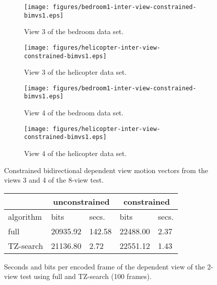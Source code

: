 \documentclass[12pt]{article}
\begin{document}
\begin{figure}
\centering
\begin{subfigure}{.5\textwidth}
\centering
\texttt{[image: figures/bedroom1-inter-view-constrained-bimvs1.eps]}
\caption{View 3 of the bedroom data set.}
\end{subfigure}
\begin{subfigure}{.5\textwidth}
\centering
\texttt{[image: figures/helicopter-inter-view-constrained-bimvs1.eps]}
\caption{View 3 of the helicopter data set.}
\end{subfigure}
\begin{subfigure}{.5\textwidth}
\centering
\texttt{[image: figures/bedroom1-inter-view-constrained-bimvs1.eps]}
\caption{View 4 of the bedroom data set.}
\end{subfigure}
\begin{subfigure}{.5\textwidth}
\centering
\texttt{[image: figures/helicopter-inter-view-constrained-bimvs1.eps]}
\caption{View 4 of the helicopter data set.}
\end{subfigure}
\caption{
Constrained bidirectional dependent view motion vectors from the views 3 and 4
of the 8-view test.
}
\end{figure}

\begin{figure}
\centering\small
\begin{tabular}{|l|l|l|l|l|}
\multicolumn{1}{c}{} & \multicolumn{2}{c}{unconstrained} & \multicolumn{2}{c}{constrained} \\ \hline
algorithm            & bits            & secs.           & bits            & secs.         \\ \hline
full                 & 20935.92        & 142.58          & 22488.00        & 2.37          \\ \hline
TZ-search            & 21136.80        & 2.72            & 22551.12        & 1.43          \\ \hline
\end{tabular}
\caption{
Seconds and bits per encoded frame of the dependent view of the 2-view test
using full and TZ-search (100 frames).
}
\end{figure}
\end{document}
